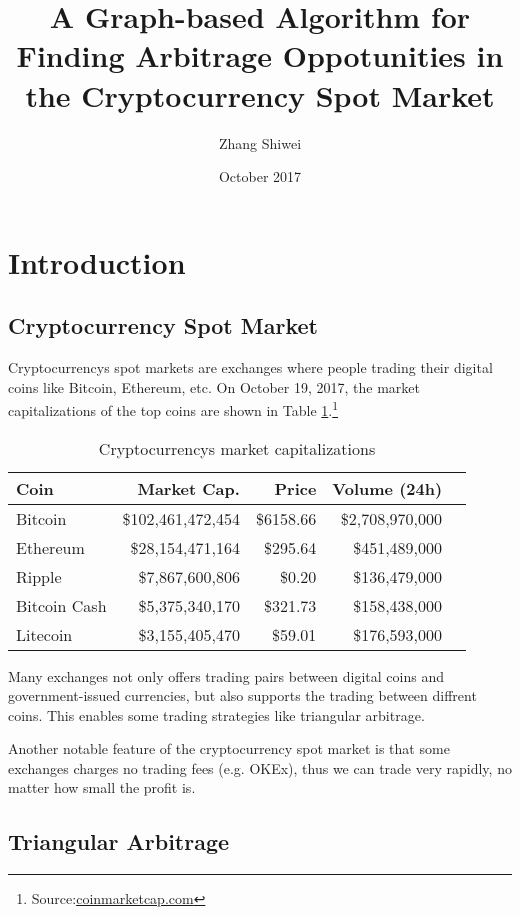\documentclass{myarticle}
\title{A Graph-based Algorithm for Finding Arbitrage Oppotunities in the Cryptocurrency Spot Market}
\author{Zhang Shiwei}
\date{October 2017}
\begin{document}
    \maketitle

    \section{Introduction}

    \subsection{Cryptocurrency Spot Market}

    Cryptocurrencys spot markets are exchanges where people trading their digital coins like Bitcoin, Ethereum, etc.
    On October 19, 2017, the market capitalizations of the top coins are shown in Table \ref{Tab:1}.\footnote{Source:\url{coinmarketcap.com}}

    \begin{table}[hb]
        \centering
        \begin{tabular}{l *{4}{r}}
            Coin & Market Cap. & Price & Volume (24h) \\
            \hline
            Bitcoin & \$102,461,472,454 & \$6158.66 & \$2,708,970,000 \\
            Ethereum & \$28,154,471,164 & \$295.64 & \$451,489,000 \\
            Ripple & \$7,867,600,806 & \$0.20 & \$136,479,000 \\
            Bitcoin Cash & \$5,375,340,170 & \$321.73 & \$158,438,000 \\
            Litecoin & \$3,155,405,470 & \$59.01 & \$176,593,000 \\
            \hline
        \end{tabular}
        \caption{Cryptocurrencys market capitalizations}\label{Tab:1}
    \end{table}

    Many exchanges not only offers trading pairs between digital coins and government-issued currencies, but also supports
    the trading between diffrent coins. This enables some trading strategies like triangular arbitrage.

    Another notable feature of the cryptocurrency spot market is that some exchanges charges no trading fees (e.g. OKEx),
    thus we can trade very rapidly, no matter how small the profit is.

    \subsection{Triangular Arbitrage}\label{triangular arbitrage}
\end{document}
